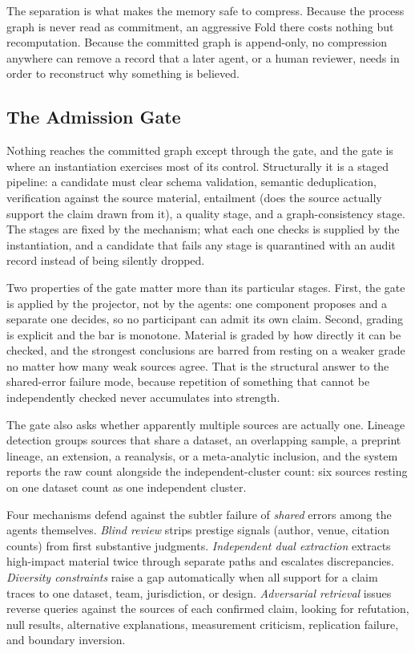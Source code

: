 The separation is what makes the memory safe to compress. Because the process
graph is never read as commitment, an aggressive Fold there costs nothing but
recomputation. Because the committed graph is append-only, no compression
anywhere can remove a record that a later agent, or a human reviewer, needs in
order to reconstruct why something is believed.

\subsection{The Admission Gate}
\label{sec:gate}

Nothing reaches the committed graph except through the gate, and the gate is
where an instantiation exercises most of its control. Structurally it is a
staged pipeline: a candidate must clear schema validation, semantic
deduplication, verification against the source material, entailment (does the
source actually support the claim drawn from it), a quality stage, and a
graph-consistency stage. The stages are fixed by the mechanism; what each one
checks is supplied by the instantiation, and a candidate that fails any stage
is quarantined with an audit record instead of being silently dropped.

Two properties of the gate matter more than its particular stages. First, the
gate is applied by the projector, not by the agents: one component proposes and
a separate one decides, so no participant can admit its own claim. Second,
grading is explicit and the bar is monotone. Material is graded by how directly
it can be checked, and the strongest conclusions are barred from resting on a
weaker grade no matter how many weak sources agree. That is the structural
answer to the shared-error failure mode, because repetition of something that
cannot be independently checked never accumulates into strength.

The gate also asks whether apparently multiple sources are actually one.
Lineage detection groups sources that share a dataset, an overlapping sample, a
preprint lineage, an extension, a reanalysis, or a meta-analytic inclusion, and
the system reports the raw count alongside the independent-cluster count: six
sources resting on one dataset count as one independent cluster.

Four mechanisms defend against the subtler failure of \emph{shared} errors
among the agents themselves. \emph{Blind review} strips prestige signals
(author, venue, citation counts) from first substantive judgments.
\emph{Independent dual extraction} extracts high-impact material twice through
separate paths and escalates discrepancies. \emph{Diversity constraints} raise
a gap automatically when all support for a claim traces to one dataset, team,
jurisdiction, or design. \emph{Adversarial retrieval} issues reverse queries
against the sources of each confirmed claim, looking for refutation, null
results, alternative explanations, measurement criticism, replication failure,
and boundary inversion.

